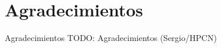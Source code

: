 \section{Agradecimientos}

\begin{frame}{Agradecimientos}
   TODO: Agradecimientos (Sergio/HPCN)
\end{frame}

